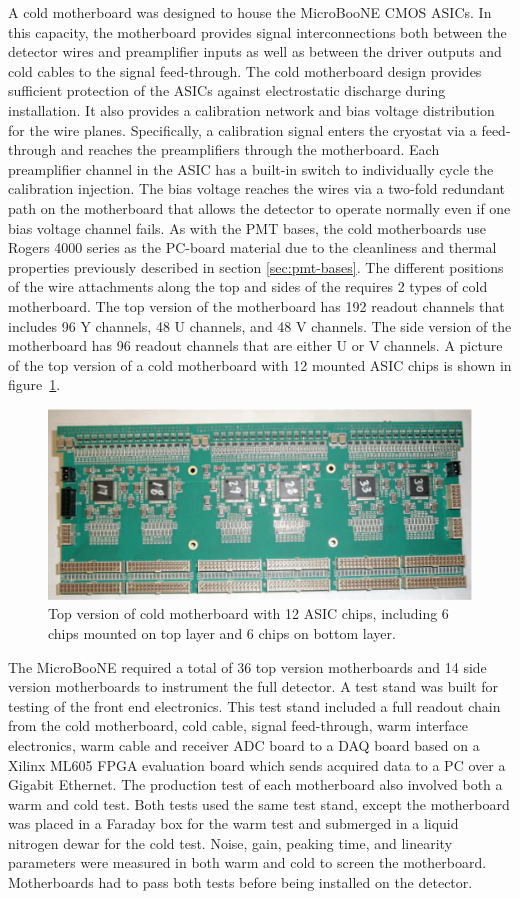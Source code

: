 A cold motherboard was designed to house the MicroBooNE CMOS ASICs. In this capacity, the motherboard provides signal interconnections both between the detector wires and preamplifier inputs as well as between the driver outputs and cold cables to the signal feed-through. The cold motherboard design provides sufficient protection of the ASICs against electrostatic discharge during installation. It also provides a calibration network and bias voltage distribution for the wire planes. Specifically, a calibration signal enters the cryostat via a feed-through and reaches the preamplifiers through the motherboard. Each preamplifier channel in the ASIC has a built-in switch to individually cycle the calibration injection. The bias voltage reaches the \lartpc wires via a two-fold redundant path on the motherboard that allows the detector to operate normally even if one bias voltage channel fails.  As with the PMT bases, the cold motherboards use Rogers 4000 series as the PC-board material due to the cleanliness and thermal properties previously described in section \ref{sec:pmt-bases}.  The different positions of the wire attachments along the top and sides of the \lartpc requires 2 types of cold motherboard. The top version of the motherboard has 192 readout channels that includes 96 Y channels, 48 U channels, and 48 V channels. The side version of the motherboard has 96 readout channels that are either U or V channels. A picture of the top version of a cold motherboard with 12 mounted ASIC chips is shown in figure~\ref{fig:figmb}. 

\begin{figure}
\centering
\includegraphics[width=0.75\linewidth]{figures/mb2.pdf}
\caption{\label{fig:figmb} Top version of cold motherboard with 12 ASIC chips, including 6 chips mounted on top layer and 6 chips on bottom layer.}
\end{figure}


The MicroBooNE \lartpc required a total of 36 top version motherboards and 14 side version motherboards to instrument the full detector. A test stand was built for testing of the front end electronics. This test stand included a full readout chain from the cold motherboard, cold cable, signal feed-through, warm interface electronics, warm cable and receiver ADC board to a DAQ board based on a Xilinx ML605 FPGA evaluation board which sends acquired data to a PC over a Gigabit Ethernet. The production test of each motherboard also involved both a warm and cold test. Both tests used the same test stand, except the motherboard was placed in a Faraday box for the warm test and submerged in a liquid nitrogen dewar for the cold test. Noise, gain, peaking time, and linearity parameters were measured in both warm and cold to screen the motherboard. Motherboards had to pass both tests  before being installed on the detector.

